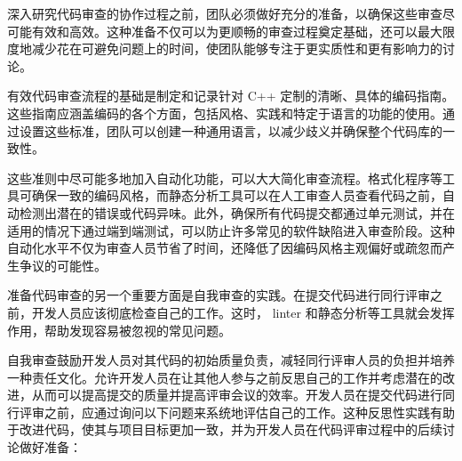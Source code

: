

深入研究代码审查的协作过程之前，团队必须做好充分的准备，以确保这些审查尽可能有效和高效。这种准备不仅可以为更顺畅的审查过程奠定基础，还可以最大限度地减少花在可避免问题上的时间，使团队能够专注于更实质性和更有影响力的讨论。


有效代码审查流程的基础是制定和记录针对 C++ 定制的清晰、具体的编码指南。这些指南应涵盖编码的各个方面，包括风格、实践和特定于语言的功能的使用。通过设置这些标准，团队可以创建一种通用语言，以减少歧义并确保整个代码库的一致性。

这些准则中尽可能多地加入自动化功能，可以大大简化审查流程。格式化程序等工具可确保一致的编码风格，而静态分析工具可以在人工审查人员查看代码之前，自动检测出潜在的错误或代码异味。此外，确保所有代码提交都通过单元测试，并在适用的情况下通过端到端测试，可以防止许多常见的软件缺陷进入审查阶段。这种自动化水平不仅为审查人员节省了时间，还降低了因编码风格主观偏好或疏忽而产生争议的可能性。


准备代码审查的另一个重要方面是自我审查的实践。在提交代码进行同行评审之前，开发人员应该彻底检查自己的工作。这时， linter 和静态分析等工具就会发挥作用，帮助发现容易被忽视的常见问题。

自我审查鼓励开发人员对其代码的初始质量负责，减轻同行评审人员的负担并培养一种责任文化。允许开发人员在让其他人参与之前反思自己的工作并考虑潜在的改进，从而可以提高提交的质量并提高评审会议的效率。开发人员在提交代码进行同行评审之前，应通过询问以下问题来系统地评估自己的工作。这种反思性实践有助于改进代码，使其与项目目标更加一致，并为开发人员在代码评审过程中的后续讨论做好准备：

